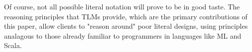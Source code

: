 \documentclass[acmsmall,review,anonymous]{acmart}\settopmatter{printfolios=true,printccs=false,printacmref=false}
\newcommand{\li}[1]{\lstinline[basicstyle=\ttfamily\fontsize{9pt}{1em}\selectfont]{#1}}
\begin{document}
Of course, not all possible literal notation will prove to be in good taste. %
The reasoning principles that TLMs provide, which are the primary contributions of this paper, allow clients to "reason around" poor literal designs, using principles analagous to those already familiar to programmers in languages like ML and Scala. %




\end{document}
